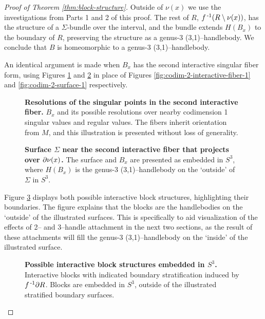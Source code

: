 \begin{proof}[Proof of Theorem \ref{thm:block-structure}]
	Outside of $\nu(x)$ we use the investigations from Parts 1 and 2 of this proof. The rest of $R$, $f^{\,\text{-}1}(R\setminus\nu(x))$, has the structure of a $\Sigma$-bundle over the interval, and the bundle extends $H(B_x)$ to the boundary of $R$, preserving the structure as a genus-3 (3,1)--handlebody.
	We conclude that $B$ is homeomorphic to a genus-3 (3,1)--handlebody.
	
	An identical argument is made when $B_x$ has the second interactive singular fiber form, using Figures \ref{fig:codim-2-interactive-fiber-2} and \ref{fig:codim-2-surface-2} in place of Figures \ref{fig:codim-2-interactive-fiber-1} and \ref{fig:codim-2-surface-1} respectively.
	
	\begin{figure}[h!]
		\caption{
			\textbf{Resolutions of the singular points in the second interactive fiber.}
			$B_x$ and its possible resolutions over nearby codimension 1 singular values and regular values.
			The fibers inherit orientation from $M$, and this illustration is presented without loss of generality.
		}
		\label{fig:codim-2-interactive-fiber-2}
	\end{figure}

	\begin{figure}[h!]
		\caption{
			\textbf{Surface $\Sigma$ near the second interactive fiber that projects over $\partial\nu(x)$.}
			The surface and $B_x$ are presented as embedded in $S^3$, where $H(B_x)$ is the genus-3 (3,1)--handlebody on the `outside' of $\Sigma$ in $S^3$.
		}
		\label{fig:codim-2-surface-2}
	\end{figure}

	Figure \ref{fig:codim-2-surface-12} displays both possible interactive block structures, highlighting their boundaries.
	The figure explains that the blocks are the handlebodies on the `outside' of the illustrated surfaces.
	This is specifically to aid visualization of the effects of 2-- and 3--handle attachment in the next two sections, as the result of these attachments will fill the genus-3 (3,1)--handlebody on the `inside' of the illustrated surface.

	\begin{figure}[h!]
	\caption{
		\textbf{Possible interactive block structures embedded in $S^3$.}
		Interactive blocks with indicated boundary stratification induced by $f^{\,\text{-}1} \partial R$.
		Blocks are embedded in $S^3$, outside of the illustrated stratified boundary surfaces.
	}
	\label{fig:codim-2-surface-12}
	\end{figure}
\end{proof}


